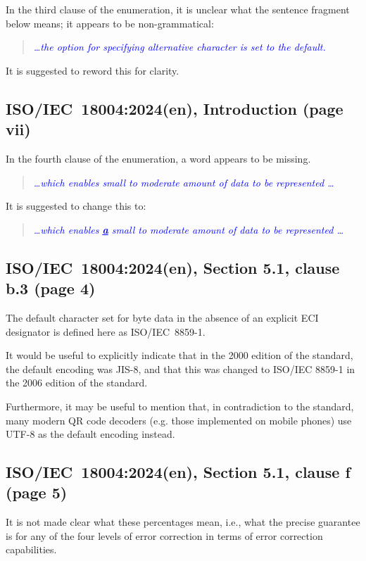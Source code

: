 \documentclass[a4paper,twoside]{article}
\newcommand{\shortstandard}{ISO/IEC~18004}
\newcommand{\standard}{\shortstandard:2024(en)}
\newcommand{\quotestandard}[1]{\textcolor{blue}{\textit{#1}}}
\newcommand{\ddd}{\dots}
\newcommand{\change}[1]{\underline{\textbf{#1}}}
\begin{document}
In the third clause of the enumeration, it is unclear what the sentence fragment below means; it appears to be non-grammatical:

\begin{quote}
\quotestandard{\ddd the option for specifying alternative character is set to the default.}
\end{quote}

It is suggested to reword this for clarity.

\subsection{\standard, Introduction (page vii)}

In the fourth clause of the enumeration, a word appears to be missing.

\begin{quote}
\quotestandard{\ddd which enables small to moderate amount of data to be represented \ddd}
\end{quote}

It is suggested to change this to:

\begin{quote}
\quotestandard{\ddd which enables \change{a} small to moderate amount of data to be represented \ddd}
\end{quote}

\subsection{\standard, Section 5.1, clause b.3 (page 4)}

The default character set for byte data in the absence of an explicit ECI designator is defined here as ISO/IEC~8859-1.

It would be useful to explicitly indicate that in the 2000 edition of the standard, the default encoding was JIS-8,
and that this was changed to ISO/IEC 8859-1 in the 2006 edition of the standard.

Furthermore, it may be useful to mention that, in contradiction to the standard, many modern QR code decoders (e.g. those
implemented on mobile phones) use UTF-8 as the default encoding instead.

\subsection{\standard, Section 5.1, clause f (page 5)}

It is not made clear what these percentages mean, i.e., what the precise guarantee is for any of the four levels of
error correction in terms of error correction capabilities.
\end{document}
